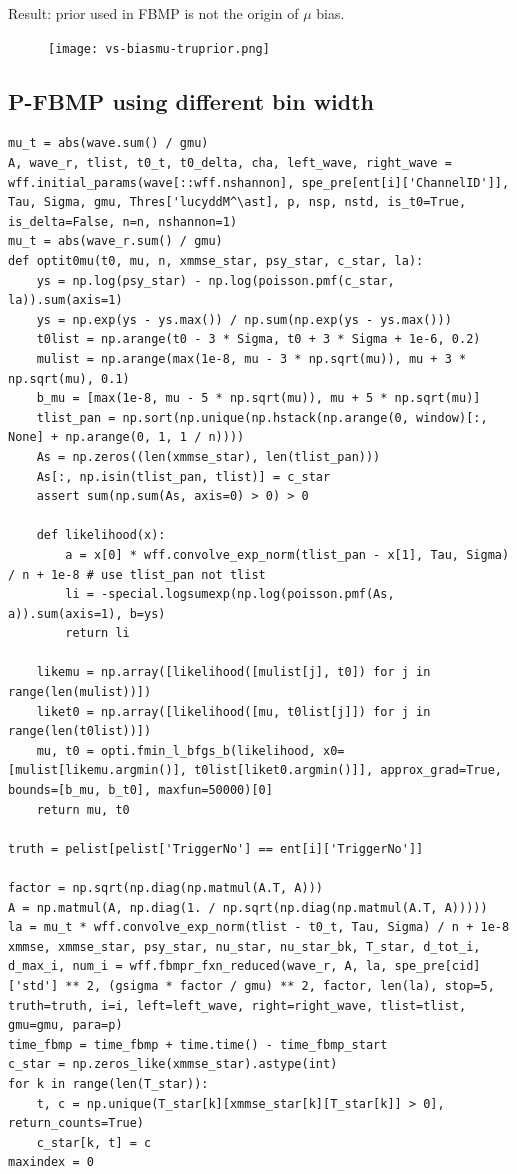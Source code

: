 \documentclass[notitlepage]{article}
\begin{document}
Result: prior used in FBMP is not the origin of $\mu$ bias. 

\begin{figure}[H]
    \texttt{[image: vs-biasmu-truprior.png]}
\end{figure}

\subsection{P-FBMP using different bin width}

\begin{lstlisting}
mu_t = abs(wave.sum() / gmu)
A, wave_r, tlist, t0_t, t0_delta, cha, left_wave, right_wave = wff.initial_params(wave[::wff.nshannon], spe_pre[ent[i]['ChannelID']], Tau, Sigma, gmu, Thres['lucyddM^\ast], p, nsp, nstd, is_t0=True, is_delta=False, n=n, nshannon=1)
mu_t = abs(wave_r.sum() / gmu)
def optit0mu(t0, mu, n, xmmse_star, psy_star, c_star, la):
    ys = np.log(psy_star) - np.log(poisson.pmf(c_star, la)).sum(axis=1)
    ys = np.exp(ys - ys.max()) / np.sum(np.exp(ys - ys.max()))
    t0list = np.arange(t0 - 3 * Sigma, t0 + 3 * Sigma + 1e-6, 0.2)
    mulist = np.arange(max(1e-8, mu - 3 * np.sqrt(mu)), mu + 3 * np.sqrt(mu), 0.1)
    b_mu = [max(1e-8, mu - 5 * np.sqrt(mu)), mu + 5 * np.sqrt(mu)]
    tlist_pan = np.sort(np.unique(np.hstack(np.arange(0, window)[:, None] + np.arange(0, 1, 1 / n))))
    As = np.zeros((len(xmmse_star), len(tlist_pan)))
    As[:, np.isin(tlist_pan, tlist)] = c_star
    assert sum(np.sum(As, axis=0) > 0) > 0

    def likelihood(x):
        a = x[0] * wff.convolve_exp_norm(tlist_pan - x[1], Tau, Sigma) / n + 1e-8 # use tlist_pan not tlist
        li = -special.logsumexp(np.log(poisson.pmf(As, a)).sum(axis=1), b=ys)
        return li

    likemu = np.array([likelihood([mulist[j], t0]) for j in range(len(mulist))])
    liket0 = np.array([likelihood([mu, t0list[j]]) for j in range(len(t0list))])
    mu, t0 = opti.fmin_l_bfgs_b(likelihood, x0=[mulist[likemu.argmin()], t0list[liket0.argmin()]], approx_grad=True, bounds=[b_mu, b_t0], maxfun=50000)[0]
    return mu, t0

truth = pelist[pelist['TriggerNo'] == ent[i]['TriggerNo']]

factor = np.sqrt(np.diag(np.matmul(A.T, A)))
A = np.matmul(A, np.diag(1. / np.sqrt(np.diag(np.matmul(A.T, A)))))
la = mu_t * wff.convolve_exp_norm(tlist - t0_t, Tau, Sigma) / n + 1e-8
xmmse, xmmse_star, psy_star, nu_star, nu_star_bk, T_star, d_tot_i, d_max_i, num_i = wff.fbmpr_fxn_reduced(wave_r, A, la, spe_pre[cid]['std'] ** 2, (gsigma * factor / gmu) ** 2, factor, len(la), stop=5, truth=truth, i=i, left=left_wave, right=right_wave, tlist=tlist, gmu=gmu, para=p)
time_fbmp = time_fbmp + time.time() - time_fbmp_start
c_star = np.zeros_like(xmmse_star).astype(int)
for k in range(len(T_star)):
    t, c = np.unique(T_star[k][xmmse_star[k][T_star[k]] > 0], return_counts=True)
    c_star[k, t] = c
maxindex = 0


\end{lstlisting}
\end{document}
